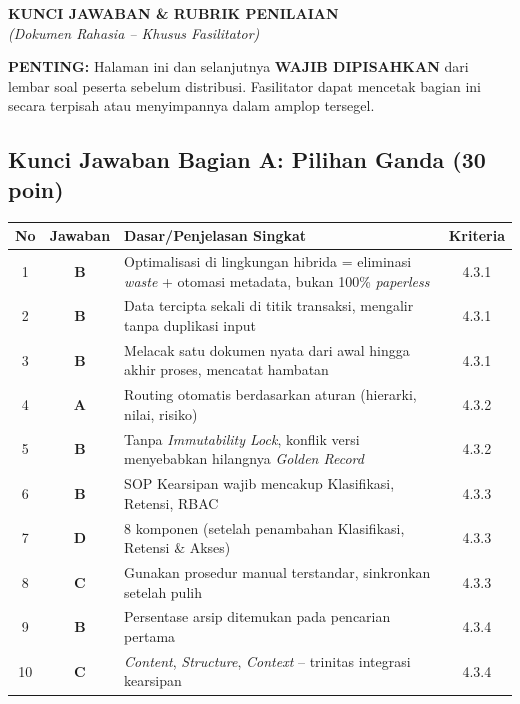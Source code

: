 \documentclass[12pt,a4paper]{report}
\begin{document}
\newpage
\begin{center}
{\LARGE\bfseries\color{red!70!black} KUNCI JAWABAN \& RUBRIK PENILAIAN}\\[0.2cm]
{\large\color{red!70!black}\textit{(Dokumen Rahasia -- Khusus Fasilitator)}}
\end{center}

\vspace{0.5cm}

\begin{answerbox}
\textbf{PENTING:} Halaman ini dan selanjutnya \textbf{WAJIB DIPISAHKAN} dari lembar soal peserta sebelum distribusi. Fasilitator dapat mencetak bagian ini secara terpisah atau menyimpannya dalam amplop tersegel.
\end{answerbox}

\vspace{0.5cm}

\subsection{Kunci Jawaban Bagian A: Pilihan Ganda (30 poin)}

\renewcommand{\arraystretch}{1.4}
\begin{center}
\begin{tabularx}{0.95\textwidth}{@{} c c X c @{}}
\toprule
\textbf{No} & \textbf{Jawaban} & \textbf{Dasar/Penjelasan Singkat} & \textbf{Kriteria} \\
\midrule
1 & \textbf{B} & Optimalisasi di lingkungan hibrida = eliminasi \textit{waste} + otomasi metadata, bukan 100\% \textit{paperless} & 4.3.1 \\
2 & \textbf{B} & Data tercipta sekali di titik transaksi, mengalir tanpa duplikasi input & 4.3.1 \\
3 & \textbf{B} & Melacak satu dokumen nyata dari awal hingga akhir proses, mencatat hambatan & 4.3.1 \\
4 & \textbf{A} & Routing otomatis berdasarkan aturan (hierarki, nilai, risiko) & 4.3.2 \\
5 & \textbf{B} & Tanpa \textit{Immutability Lock}, konflik versi menyebabkan hilangnya \textit{Golden Record} & 4.3.2 \\
6 & \textbf{B} & SOP Kearsipan wajib mencakup Klasifikasi, Retensi, RBAC & 4.3.3 \\
7 & \textbf{D} & 8 komponen (setelah penambahan Klasifikasi, Retensi \& Akses) & 4.3.3 \\
8 & \textbf{C} & Gunakan prosedur manual terstandar, sinkronkan setelah pulih & 4.3.3 \\
9 & \textbf{B} & Persentase arsip ditemukan pada pencarian pertama & 4.3.4 \\
10 & \textbf{C} & \textit{Content}, \textit{Structure}, \textit{Context} -- trinitas integrasi kearsipan & 4.3.4 \\
\bottomrule
\end{tabularx}
\end{center}
\renewcommand{\arraystretch}{1.0}
\end{document}
